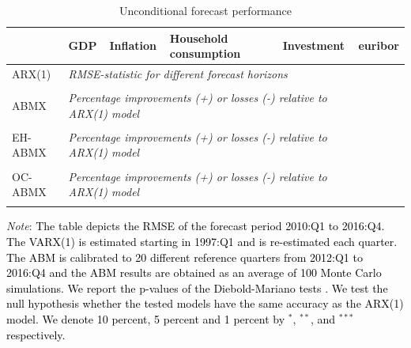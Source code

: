 \begin{table}[!h]
	\caption{Unconditional forecast performance } 
	\label{table:rmse_ed_ed_abmx_uf}
	\centering
		\begin{tabular}{llllll}
			\toprule
			& GDP & Inflation & Household consumption & Investment & euribor\\
			\midrule
			ARX(1) & \multicolumn{4}{l}{\textit{RMSE-statistic for different forecast horizons}} \\ \midrule
			 \\ \midrule
           ABMX & \multicolumn{4}{l}{\textit{Percentage improvements (+) or losses (-) relative to ARX(1) model}} \\ \midrule
           	 \\ \midrule
           EH-ABMX & \multicolumn{4}{l}{\textit{Percentage improvements (+) or losses (-) relative to ARX(1) model}} \\ \midrule
			 \\ \midrule
			OC-ABMX & \multicolumn{4}{l}{\textit{Percentage improvements (+) or losses (-) relative to ARX(1) model}} \\ \midrule
			
			\\ \bottomrule
		\end{tabular}
	\begin{tablenotes}
		\footnotesize \item \textit{Note}: \textcolor{black}{The table depicts the RMSE of the forecast period 2010:Q1 to 201\textcolor{black}{6}:Q4. The VARX(1) is estimated starting in 1997:Q1 and is re-estimated each quarter. The ABM is calibrated to \textcolor{black}{20} different reference quarters from 2012:Q1 to \textcolor{black}{2016:Q4} and the ABM results are obtained as an average of 100 Monte Carlo simulations. We report the p-values of the Diebold-Mariano tests \citep{harveyTestingEqualityPrediction1997}.  We test the null hypothesis whether the tested models have the same accuracy as the ARX(1) model. We denote  10 percent, 5 percent and 1 percent by $^{*}$, $^{**}$, and $^{***}$ respectively.}
	\end{tablenotes}
\end{table}

